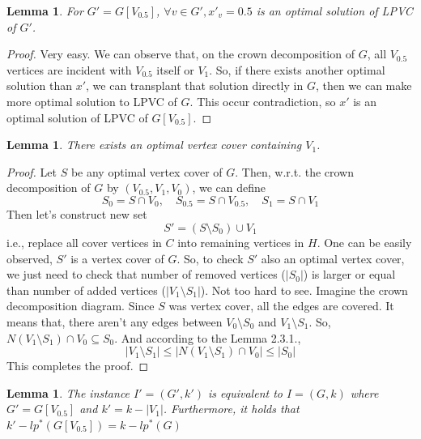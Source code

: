 \documentclass[12pt, a4paper, openany, twoside]{book}
\newtheorem{lem}[thm]{Lemma}
\theoremstyle{definition}
\theoremstyle{remark}
\theoremstyle{plain}
\numberwithin{equation}{section}
\begin{document}
\begin{lem}
    
For $G' = G[V_{0.5}]$, $\forall v \in G', x'_v = 0.5$ is an optimal solution of LPVC of $G'$.

\end{lem}

\begin{proof}
    
Very easy. We can observe that, on the crown decomposition of $G$, all $V_{0.5}$ vertices are incident with $V_{0.5}$ itself or $V_1$.
So, if there exists another optimal solution than $x'$, we can transplant that solution directly in $G$, then we can make more optimal solution to LPVC of $G$. 
This occur contradiction, so $x'$ is an optimal solution of LPVC of $G[V_{0.5}]$. 

\end{proof}

\begin{lem}

There exists an optimal vertex cover containing $V_1$. 

\end{lem}

\begin{proof}
    
Let $S$ be any optimal vertex cover of $G$. Then, w.r.t. the crown decomposition of $G$ by $(V_{0.5}, V_1, V_0)$, 
we can define 
\[S_0 = S \cap V_0, \quad S_{0.5} = S \cap V_{0.5}, \quad S_1 = S \cap V_1\]
Then let's construct new set 
\[S' = (S \setminus S_0) \cup V_1\]
i.e., replace all cover vertices in $C$ into remaining vertices in $H$. One can be easily observed, $S'$ is a vertex cover of $G$. 
So, to check $S'$ also an optimal vertex cover, we just need to check that number of removed vertices ($|S_0|$) is larger or equal than number of added vertices ($|V_1 \setminus S_1|$). 
Not too hard to see. Imagine the crown decomposition diagram. Since $S$ was vertex cover, all the edges are covered. It means that, there aren't any edges between 
$V_0 \setminus S_0$ and $V_1 \setminus S_1$. So, $N(V_1 \setminus S_1) \cap V_0 \subseteq S_0$. 
And according to the Lemma 2.3.1., 
\[|V_1 \setminus S_1| \leq |N(V_1 \setminus S_1) \cap V_0| \leq |S_0|\]
This completes the proof.

\end{proof}

\begin{lem}
    
The instance $I' = (G', k')$ is equivalent to $I = (G, k)$ where $G' = G[V_{0.5}]$ and $k' = k - |V_1|$. 
Furthermore, it holds that $k' - lp^*(G[V_{0.5}]) = k - lp^*(G)$

\end{lem}
\end{document}
